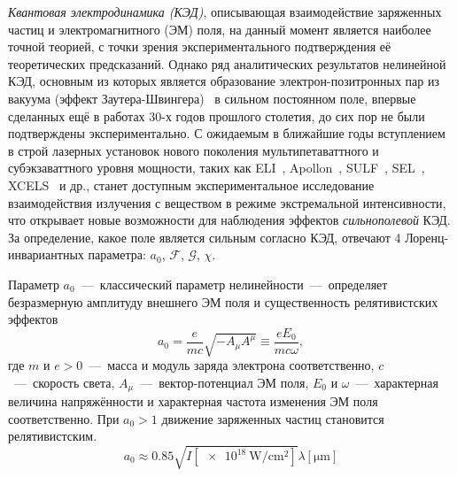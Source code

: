 
{\actuality} 

\textit{Квантовая электродинамика (КЭД)}, описывающая взаимодействие заряженных частиц и электромагнитного (ЭМ) поля, на данный момент является наиболее точной теорией, с точки зрения экспериментального подтверждения её теоретических предсказаний.
Однако ряд аналитических результатов нелинейной КЭД, основным из которых является образование электрон-позитронных пар из вакуума (эффект Заутера-Швингера)~\cite{Sauter31, Schwinger51} в сильном постоянном поле, впервые сделанных ещё в работах 30-х годов прошлого столетия, до сих пор не были подтверждены экспериментально.
С ожидаемым в ближайшие годы вступлением в строй лазерных установок нового поколения мультипетаваттного и субэкзаваттного уровня мощности, таких как ELI~\cite{ELI}, Apollon~\cite{zou2015design}, SULF~\cite{SULF}, SEL~\cite{SEL}, XCELS~\cite{XCELS} и др., станет доступным экспериментальное исследование взаимодействия излучения с веществом в режиме экстремальной интенсивности, что открывает новые возможности для наблюдения эффектов \textit{сильнополевой} КЭД.
За определение, какое поле является сильным согласно КЭД, отвечают 4 Лоренц-инвариантных параметра: $a_0$, $\mathcal{F}$, $\mathcal{G}$, $\chi$.

Параметр $a_0$~---~классический параметр нелинейности~---~определяет безразмерную амплитуду внешнего ЭМ поля и существенность релятивистских эффектов
\begin{equation}
    a_0  = \frac{e}{mc}\sqrt{-A_\mu A^\mu} \equiv \frac{eE_0}{m c \omega},
\end{equation}
где $m$ и $e>0$~---~масса и модуль заряда электрона соответственно, $c$~---~скорость света, $A_\mu$~---~вектор-потенциал ЭМ поля, $E_0$ и $\omega$~---~характерная величина напряжённости и характерная частота изменения ЭМ поля соответственно.
При $a_0 > 1$ движение заряженных частиц становится релятивистским.
\begin{equation}
  a_0 \approx 0.85 \sqrt{I[\SI{e18}{\watt/\centi\meter^2}]}\lambda[\si{\um}]
\end{equation}

